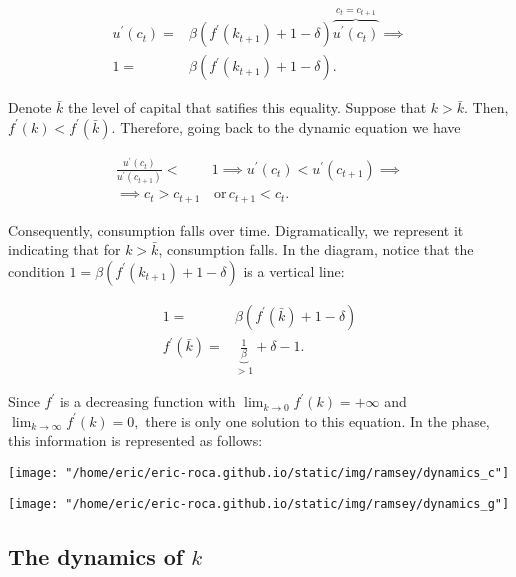 \documentclass[11pt,a4paper,english]{article}
\begin{document}
\begin{align*}
    u^\prime(c_t) =& \beta (f^\prime(k_{t+1}) + 1 - \delta)\overbrace{u^\prime(c_t)}^{c_t=c_{t+1}} \implies\\
    1 =& \beta(f^\prime(k_{t+1}) + 1 - \delta).
\end{align*}

Denote $\bar{k}$ the level of capital that satifies this equality.
Suppose that $k > \bar{k}.$
Then, $f^\prime(k) < f^\prime(\bar{k}).$
Therefore, going back to the dynamic equation we have

\begin{align*}
    \frac{u^\prime(c_t)}{u^\prime(c_{t+1})} <& 1 \implies u^\prime(c_t) < u^\prime(c_{t+1}) \implies \\
        \implies c_t > c_{t+1}& \, \mathrm{or}\, c_{t+1} < c_t.
\end{align*}

Consequently, consumption falls over time.
Digramatically, we represent it indicating that for $k > \bar{k}$, consumption falls.
In the diagram, notice that the condition $1 = \beta(f^\prime(k_{t+1}) + 1 - \delta)$ is a vertical line:

\begin{align*}
    1 =& \beta (f^\prime(\bar{k}) + 1 - \delta) \\
    f^\prime(\bar{k}) =& \underbrace{\frac{1}{\beta}}_{>1}+\delta-1.
\end{align*}

Since $f^\prime$ is a decreasing function with $\lim_{k\rightarrow 0}f^\prime(k) = +\infty$ and $\lim_{k\rightarrow \infty}f^\prime(k) = 0,$ there is only one solution to this equation.
In the phase, this information is represented as follows:

\vspace{1em}
\begin{minipage}{0.45\textwidth}
\centering
\texttt{[image: "/home/eric/eric-roca.github.io/static/img/ramsey/dynamics\_c"]}
\end{minipage}
\hfill
\begin{minipage}{0.45\textwidth}
\centering
\texttt{[image: "/home/eric/eric-roca.github.io/static/img/ramsey/dynamics\_g"]}
\end{minipage}

\subsection{The dynamics of $k$}
\end{document}
